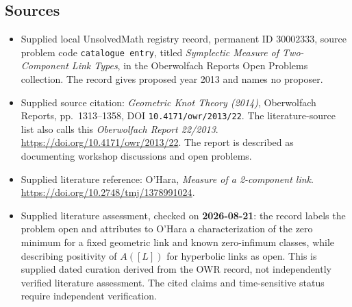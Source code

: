 \documentclass[11pt]{article}
\begin{document}
\subsection{Sources}
\begin{itemize}
\item Supplied local UnsolvedMath registry record, permanent ID \(30002333\), source problem code \texttt{catalogue entry}, titled \emph{Symplectic Measure of Two-Component Link Types}, in the Oberwolfach Reports Open Problems collection. The record gives proposed year 2013 and names no proposer.
\item Supplied source citation: \emph{Geometric Knot Theory (2014)}, Oberwolfach Reports, pp.\ 1313--1358, DOI \texttt{10.4171/owr/2013/22}. The literature-source list also calls this \emph{Oberwolfach Report 22/2013}. \url{https://doi.org/10.4171/owr/2013/22}. The report is described as documenting workshop discussions and open problems.
\item Supplied literature reference: O'Hara, \emph{Measure of a 2-component link}. \url{https://doi.org/10.2748/tmj/1378991024}.
\item Supplied literature assessment, checked on \textbf{2026-08-21}: the record labels the problem open and attributes to O'Hara a characterization of the zero minimum for a fixed geometric link and known zero-infimum classes, while describing positivity of \(A([L])\) for hyperbolic links as open. This is supplied dated curation derived from the OWR record, not independently verified literature assessment. The cited claims and time-sensitive status require independent verification.
\end{itemize}
\end{document}
